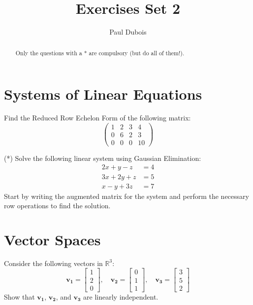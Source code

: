 \documentclass[]{article}
\title{Exercises Set 2}
\author{Paul Dubois}
\begin{document}
	
	\maketitle
	
	\begin{abstract}
		Only the questions with a * are compulsory (but do all of them!).
	\end{abstract}
	
	\section{Systems of Linear Equations}
	Find the Reduced Row Echelon Form of the following matrix:
	$$\begin{pmatrix}
		1 & 2 & 3 & 4\\
		0 & 6 & 2 & 3\\
		0 & 0 & 0 & 10
	\end{pmatrix}$$
	
	(*) Solve the following linear system using Gaussian Elimination:
	\begin{align*}
		2x + y - z &= 4 \\
		3x + 2y + z &= 5 \\
		x - y + 3z &= 7
	\end{align*}
	Start by writing the augmented matrix for the system and perform the necessary row operations to find the solution.
	
	
	\section{Vector Spaces}
	Consider the following vectors in $\mathbb{R}^3$:
	$$
	\mathbf{v_1} = \begin{bmatrix}
		1 \\
		2 \\
		0
	\end{bmatrix}, \quad
	\mathbf{v_2} = \begin{bmatrix}
		0 \\
		1 \\
		1
	\end{bmatrix}, \quad
	\mathbf{v_3} = \begin{bmatrix}
		3 \\
		5 \\
		2
	\end{bmatrix}
	$$
	Show that $\mathbf{v_1}$, $\mathbf{v_2}$, and $\mathbf{v_3}$ are linearly independent.
	
		

	
\end{document}
